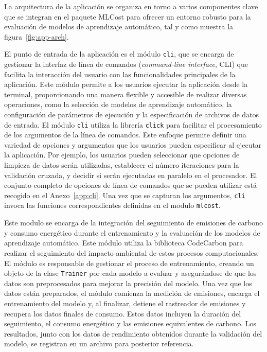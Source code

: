La arquitectura de la aplicación se organiza en torno a varios componentes clave que se integran en el paquete MLCost para ofrecer un entorno robusto para la evaluación de modelos de aprendizaje automático, tal y como muestra la figura~\ref{fig:app-arch}.

El punto de entrada de la aplicación es el módulo \texttt{cli}, que se encarga de gestionar la interfaz de línea de comandos (\emph{command-line interface}, CLI) que facilita la interacción del usuario con las funcionalidades principales de la aplicación. Este módulo permite a los usuarios ejecutar la aplicación desde la terminal, proporcionando una manera flexible y accesible de realizar diversas operaciones, como la selección de modelos de aprendizaje automático, la configuración de parámetros de ejecución y la especificación de archivos de datos de entrada. El módulo \texttt{cli} utiliza la librería \texttt{click} para facilitar el procesamiento de los argumentos de la línea de comandos. Este enfoque permite definir una variedad de opciones y argumentos que los usuarios pueden especificar al ejecutar la aplicación. Por ejemplo, los usuarios pueden seleccionar que opciones de limpieza de datos serán utilizadas, establecer el número iteraciones para la validación cruzada, y decidir si serán ejecutadas en paralelo en el procesador. El conjunto completo de opciones de línea de comandos que se pueden utilizar está recogido en el Anexo~\ref{app:cli}. Una vez que se capturan los argumentos, \texttt{cli} invoca las funciones correspondientes definidas en el modulo \texttt{mlcost}.

Este modulo se encarga de la integración del seguimiento de emisiones de carbono y consumo energético durante el entrenamiento y la evaluación de los modelos de aprendizaje automático. Este módulo utiliza la biblioteca CodeCarbon para realizar el seguimiento del impacto ambiental de estos procesos computacionales. El módulo es responsable de gestionar el proceso de entrenamiento, creando un objeto de la clase \texttt{Trainer} por cada modelo a evaluar y asegurándose de que los datos son preprocesados para mejorar la precisión del modelo. Una vez que los datos están preparados, el módulo comienza la medición de emisiones, encarga el entrenamiento del modelo y, al finalizar, detiene el rastreador de emisiones y recupera los datos finales de consumo. Estos datos incluyen la duración del seguimiento, el consumo energético y las emisiones equivalentes de carbono. Los resultados, junto con los datos de rendimiento obtenidos durante la validación del modelo, se registran en un archivo para posterior referencia.

